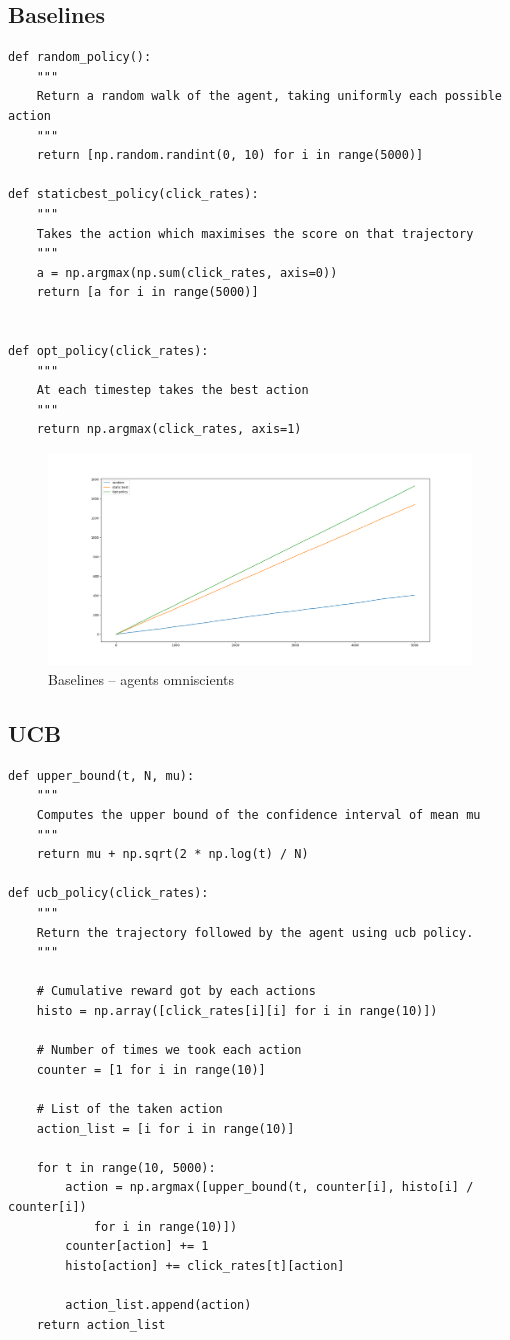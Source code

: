 \documentclass{standalone}
\begin{document}
	
	\subsection{Baselines}
	
	\begin{verbatim}
def random_policy():
	"""
	Return a random walk of the agent, taking uniformly each possible action
	"""
	return [np.random.randint(0, 10) for i in range(5000)]		
		
def staticbest_policy(click_rates):
	"""
	Takes the action which maximises the score on that trajectory
	"""
	a = np.argmax(np.sum(click_rates, axis=0))
	return [a for i in range(5000)]
		
		
def opt_policy(click_rates):
	"""
	At each timestep takes the best action
	"""
	return np.argmax(click_rates, axis=1)
	\end{verbatim}
	
	\begin{figure}[H]
		\centering
		\includegraphics[scale=0.3]{img/baselines.png}
		\caption{Baselines -- agents omniscients}
	\end{figure}
	
	\subsection{UCB}
	
	\begin{verbatim}
def upper_bound(t, N, mu):
	"""
	Computes the upper bound of the confidence interval of mean mu
	"""
	return mu + np.sqrt(2 * np.log(t) / N)

def ucb_policy(click_rates):
	"""
	Return the trajectory followed by the agent using ucb policy.
	"""
	
	# Cumulative reward got by each actions
	histo = np.array([click_rates[i][i] for i in range(10)])
	
	# Number of times we took each action
	counter = [1 for i in range(10)]

	# List of the taken action
	action_list = [i for i in range(10)]

	for t in range(10, 5000):
		action = np.argmax([upper_bound(t, counter[i], histo[i] / counter[i]) 
			for i in range(10)])
		counter[action] += 1
		histo[action] += click_rates[t][action]

		action_list.append(action)
	return action_list
	\end{verbatim}
	
\end{document}
